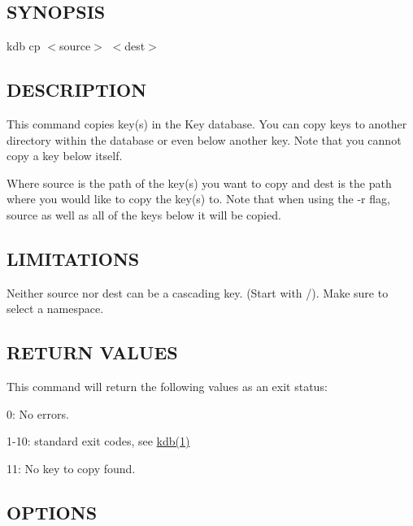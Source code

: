 \subsection*{S\+Y\+N\+O\+P\+S\+IS}

{\ttfamily kdb cp $<$source$>$ $<$dest$>$}

\subsection*{D\+E\+S\+C\+R\+I\+P\+T\+I\+ON}

This command copies key(s) in the Key database. You can copy keys to another directory within the database or even below another key. Note that you cannot copy a key below itself.

Where {\ttfamily source} is the path of the key(s) you want to copy and {\ttfamily dest} is the path where you would like to copy the key(s) to. Note that when using the {\ttfamily -\/r} flag, {\ttfamily source} as well as all of the keys below it will be copied.

\subsection*{L\+I\+M\+I\+T\+A\+T\+I\+O\+NS}

Neither {\ttfamily source} nor {\ttfamily dest} can be a cascading key. (Start with {\ttfamily /}). Make sure to select a namespace.

\subsection*{R\+E\+T\+U\+RN V\+A\+L\+U\+ES}

This command will return the following values as an exit status\+:


\begin{DoxyItemize}
\item 0\+: No errors.
\item 1-\/10\+: standard exit codes, see \hyperlink{doc_help_kdb_md}{kdb(1)}
\item 11\+: No key to copy found.
\end{DoxyItemize}

\subsection*{O\+P\+T\+I\+O\+NS}


